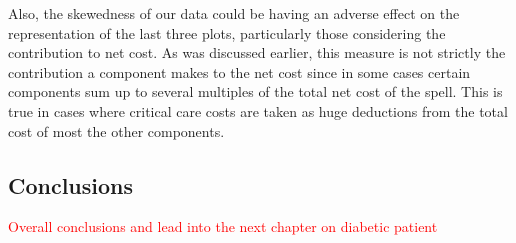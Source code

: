 Also, the skewedness of our data could be having an adverse effect on the
representation of the last three plots, particularly those considering the
contribution to net cost. As was discussed earlier, this measure is not strictly
the contribution a component makes to the net cost since in some cases certain
components sum up to several multiples of the total net cost of the spell. This
is true in cases where critical care costs are taken as huge deductions from the
total cost of most the other components.

\subsection{Conclusions}

\textcolor{red}{%
    Overall conclusions and lead into the next chapter on diabetic patient
}
